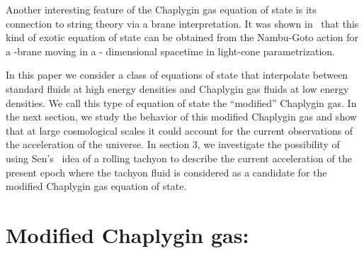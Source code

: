 \documentclass[a4paper,12pt,a4]{article}
\begin{document}
Another interesting feature of the Chaplygin gas equation of state 
is its connection to string theory via a brane interpretation.  
It was shown in~\cite{nao} that this kind of exotic equation of state can 
be obtained from the Nambu-Goto action for a \coordHE{}-brane moving in a \coordHE{}-
dimensional spacetime in light-cone parametrization. 
 
In this paper we consider a class of equations of state  
that interpolate between standard fluids at high energy densities
and Chaplygin gas fluids at low energy densities. We call 
this type of equation of state the ``modified'' Chaplygin gas. In the 
next section, we study the behavior of this modified Chaplygin gas and show 
that at large cosmological scales it could account for the current 
observations of the acceleration of the universe. In section 3, we 
investigate the possibility of using Sen's~\cite{sen1, sen2,sen3} idea of 
a rolling tachyon to describe the current acceleration of the present 
epoch where the tachyon fluid is considered as a candidate for 
the modified Chaplygin gas equation of state. 

\section{Modified Chaplygin gas:}
\end{document}
